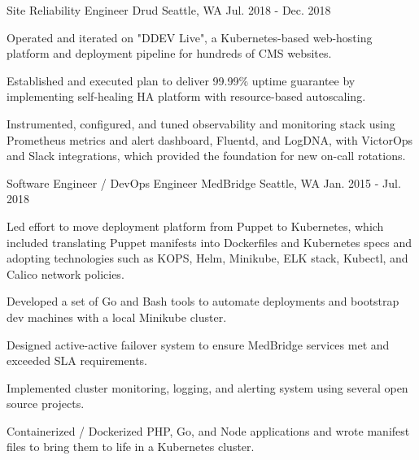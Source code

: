\begin{cventries}

\cventry
{Site Reliability Engineer} %
{Drud} %
{Seattle, WA} %
{Jul. 2018 - Dec. 2018} %
{ %
\begin{cvitems}
\item {Operated and iterated on "DDEV Live", a Kubernetes-based web-hosting platform and deployment pipeline for hundreds of CMS websites.}
\item {Established and executed plan to deliver 99.99\% uptime guarantee by implementing self-healing HA platform with resource-based autoscaling.}
\item {Instrumented, configured, and tuned observability and monitoring stack using Prometheus metrics and alert dashboard, Fluentd, and LogDNA, with VictorOps and Slack integrations, which provided the foundation for new on-call rotations.}
\end{cvitems}
}


\cventry
{Software Engineer / DevOps Engineer} %
{MedBridge} %
{Seattle, WA} %
{Jan. 2015 - Jul. 2018} %
{ %
\begin{cvitems}
\item {Led effort to move deployment platform from Puppet to Kubernetes, which included translating Puppet manifests into Dockerfiles and Kubernetes specs and adopting technologies such as KOPS, Helm, Minikube, ELK stack, Kubectl, and Calico network policies.}
\item {Developed a set of Go and Bash tools to automate deployments and bootstrap dev machines with a local Minikube cluster.}
\item {Designed active-active failover system to ensure MedBridge services met and exceeded SLA requirements.}
\item {Implemented cluster monitoring, logging, and alerting system using several open source projects.} 
\item {Containerized / Dockerized PHP, Go, and Node applications and wrote manifest files to bring them to life in a Kubernetes cluster.}
\end{cvitems}
}




\end{cventries}
